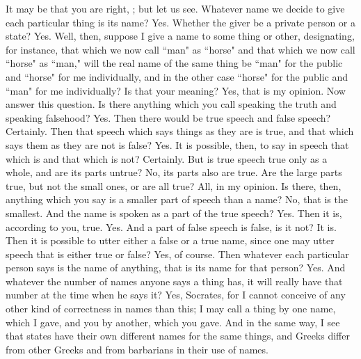 \socratesspeaks
It may be that you are right, \hermogenesspeaks; but let us see. Whatever name we decide to give each particular thing is its name?
\hermogenesspeaks
Yes.
\socratesspeaks
Whether the giver be a private person or a state?
\hermogenesspeaks
Yes.
\socratesspeaks
Well, then, suppose I give a name to some thing or other, designating, for instance, that which we now call ``man" as ``horse" and that which we now call ``horse" as ``man," will the real name of the same thing be ``man" for the public and ``horse" for me individually, and in the other case ``horse" for the public and ``man" for me individually? Is that your meaning? 
\hermogenesspeaks
Yes, that is my opinion.
\socratesspeaks
Now answer this question. Is there anything which you call speaking the truth and speaking falsehood?
\hermogenesspeaks
Yes.
\socratesspeaks
Then there would be true speech and false speech?
\hermogenesspeaks
Certainly.
\socratesspeaks
Then that speech which says things as they are is true, and that which says them as they are not is false?
\hermogenesspeaks
Yes.
\socratesspeaks
It is possible, then, to say in speech that which is and that which is not?
\hermogenesspeaks
Certainly.
\socratesspeaks
But is true speech true only as a whole,  and are its parts untrue?
\hermogenesspeaks
No, its parts also are true.
\socratesspeaks
Are the large parts true, but not the small ones, or are all true?
\hermogenesspeaks
All, in my opinion.
\socratesspeaks
Is there, then, anything which you say is a smaller part of speech than a name?
\hermogenesspeaks
No, that is the smallest.
\socratesspeaks
And the name is spoken as a part of the true speech?
\hermogenesspeaks
Yes.
\socratesspeaks
Then it is, according to you, true.
\hermogenesspeaks
Yes.
\socratesspeaks
And a part of false speech is false, is it not?
\hermogenesspeaks
It is.
\socratesspeaks
Then it is possible to utter either a false or a true name, since one may utter speech that is either true or false? 
\hermogenesspeaks
Yes, of course.
\socratesspeaks
Then whatever each particular person says is the name of anything, that is its name for that person?
\hermogenesspeaks
Yes.
\socratesspeaks
And whatever the number of names anyone says a thing has, it will really have that number at the time when he says it?
\hermogenesspeaks
Yes, Socrates, for I cannot conceive of any other kind of correctness in names than this; I may call a thing by one name, which I gave, and you by another, which you gave. And in the same way, I see that states have their own different names for the same things,  and Greeks differ from other Greeks and from barbarians in their use of names.
